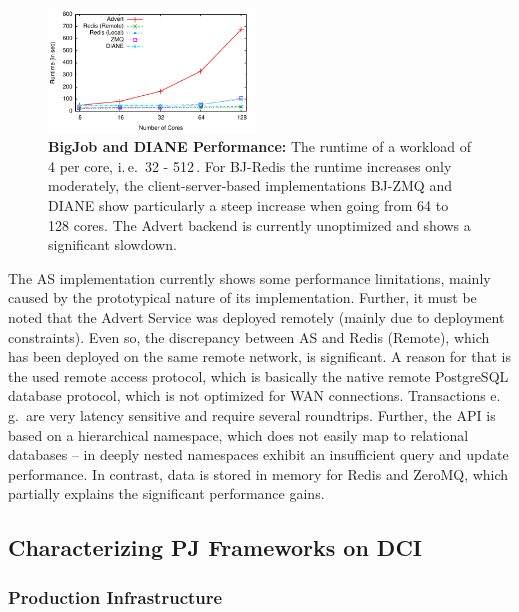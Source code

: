 \documentclass[conference]{IEEEtran}
\begin{document}
\begin{figure}[htbp] 
 \centering
 \includegraphics[width=0.49\textwidth]{../perf/bigjob-varying-cores-alamo.pdf}
 \up\up
 \caption{\textbf{BigJob and DIANE Performance:}  The
  runtime of a workload of 4 \cus per core, i.\,e.\ 32 - 512\,\cus. For 
BJ-Redis the runtime  increases only moderately, the client-server-based 
implementations BJ-ZMQ and DIANE show particularly a steep increase when going 
from 64 to 128 cores. The 
  Advert backend is currently unoptimized and shows a significant slowdown.
  }
 \label{fig:perf_bigjob-varying-cores} 
\end{figure}

The AS implementation currently shows some performance
limitations, mainly caused by the prototypical nature of its
implementation.  Further, it must be noted that the Advert Service was
deployed remotely (mainly due to deployment constraints). Even so, the
discrepancy between AS and Redis (Remote), which has been
deployed on the same remote network, is significant. A reason for that
is the used remote access protocol, which is basically the native
remote PostgreSQL database protocol, which is not optimized for WAN
connections.
%
%
Transactions e.\,g.\ are very latency sensitive and require several
roundtrips.  Further, the API is based on a hierarchical namespace,
which does not easily map to relational databases -- in deeply nested
namespaces exhibit an insufficient query and update performance. In
contrast, data is stored in memory for Redis and ZeroMQ, which
partially explains the significant performance gains.

\subsection{Characterizing PJ Frameworks on DCI}
\label{sec:fg-xsede-osg-egi}


\subsubsection*{Production Infrastructure} 
\end{document}
